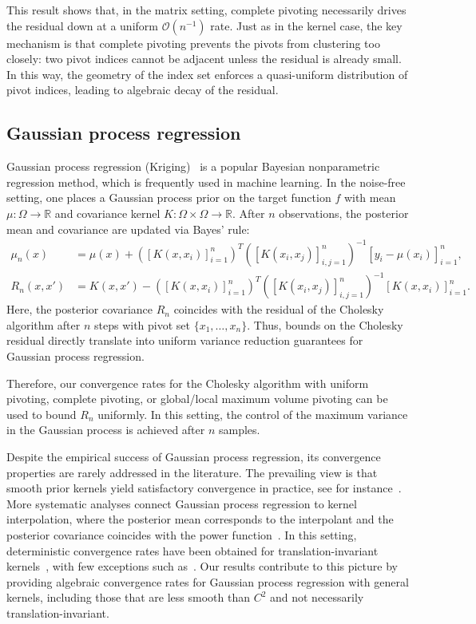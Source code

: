 \documentclass{amsart}
\theoremstyle{definition}
\theoremstyle{remark}
\begin{document}
This result shows that, in the matrix setting, complete pivoting necessarily drives the residual down at a uniform $\mathcal{O}(n^{-1})$ rate. 
Just as in the kernel case, the key mechanism is that complete pivoting prevents the pivots from clustering too closely: two pivot indices cannot be adjacent unless the residual is already small. In this way, the geometry of the index set enforces a quasi-uniform distribution of pivot indices, leading to algebraic decay of the residual. 

\subsection{Gaussian process regression}\label{sec:GaussianProcessRegression}

Gaussian process regression (Kriging)~\cite{williams2006gaussian} is a popular Bayesian nonparametric regression method, which is frequently used in machine learning. In the noise-free setting, one places a Gaussian process prior on the target function $f$ with mean $\mu:\Omega\to\mathbb{R}$ and covariance kernel $K:\Omega\times\Omega\to\mathbb{R}$. After $n$ observations, the posterior mean and covariance are updated via Bayes’ rule:
\[
\begin{aligned}
    \mu_n(x) &= \mu(x) + ([K(x, x_i)]_{i=1}^n)^T\left([K(x_i, x_j)]_{i, j=1}^n\right)^{-1}[y_i - \mu(x_i)]_{i=1}^n,\\
    R_n(x, x') &= K(x, x') - ([K(x, x_i)]_{i=1}^n)^T\left([K(x_i, x_j)]_{i, j=1}^n\right)^{-1}[K(x, x_i)]_{i=1}^n.
\end{aligned}
\]
Here, the posterior covariance $R_n$ coincides with the residual of the Cholesky algorithm after $n$ steps with pivot set $\{x_1,\dots,x_n\}$. Thus, bounds on the Cholesky residual directly translate into uniform variance reduction guarantees for Gaussian process regression.

Therefore, our convergence rates for the Cholesky algorithm with uniform pivoting, complete pivoting, or global/local maximum volume pivoting can be used to bound $R_n$ uniformly. In this setting, the control of the maximum variance in the Gaussian process is achieved after $n$ samples. 

Despite the empirical success of Gaussian process regression, its convergence properties are rarely addressed in the literature. The prevailing view is that smooth prior kernels yield satisfactory convergence in practice, see for instance~\cite{ambikasaran2015fast}. More systematic analyses connect Gaussian process regression to kernel interpolation, where the posterior mean corresponds to the interpolant and the posterior covariance coincides with the power function~\cite{scheuerer2013interpolation}. In this setting, deterministic convergence rates have been obtained for translation-invariant kernels~\cite{kanagawa2018gaussian,stuart2018posterior}, with few exceptions such as~\cite{de2005near}. Our results contribute to this picture by providing algebraic convergence rates for Gaussian process regression with general kernels, including those that are less smooth than $C^2$ and not necessarily translation-invariant. 
\end{document}
